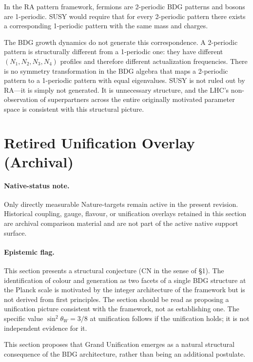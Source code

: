 \documentclass[11pt]{article}
\begin{document}
In the RA pattern framework, fermions are 2-periodic BDG patterns and bosons are 1-periodic. SUSY would require that for every 2-periodic pattern there exists a corresponding 1-periodic pattern with the same mass and charges.

The BDG growth dynamics do not generate this correspondence. A 2-periodic pattern is structurally different from a 1-periodic one: they have different $(N_1,N_2,N_3,N_4)$ profiles and therefore different actualization frequencies. There is no symmetry transformation in the BDG algebra that maps a 2-periodic pattern to a 1-periodic pattern with equal eigenvalues. SUSY is not ruled out by RA---it is simply not generated. It is unnecessary structure, and the LHC's non-observation of superpartners across the entire originally motivated parameter space is consistent with this structural picture.

\section{Retired Unification Overlay (Archival)}

\paragraph{Native-status note.} Only directly measurable Nature-targets remain active in the present revision. Historical coupling, gauge, flavour, or unification overlays retained in this section are archival comparison material and are not part of the active native support surface.
\label{sec:gut}

\paragraph{Epistemic flag.} This section presents a structural conjecture (CN in the sense of \S1). The identification of colour and generation as two facets of a single BDG structure at the Planck scale is motivated by the integer architecture of the framework but is not derived from first principles. The section should be read as proposing a unification picture consistent with the framework, not as establishing one. The specific value $\sin^2\theta_W=3/8$ at unification follows if the unification holds; it is not independent evidence for it.

This section proposes that Grand Unification emerges as a natural structural consequence of the BDG architecture, rather than being an additional postulate.
\end{document}

